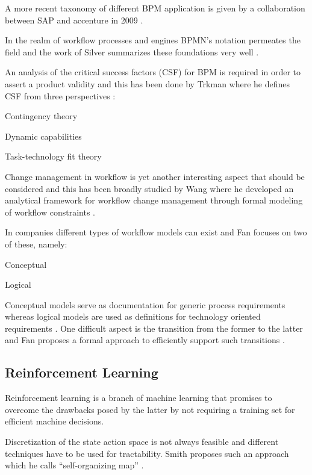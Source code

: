 \documentclass{seal_thesis}
\begin{document}
A more recent taxonomy of different BPM application is given by a collaboration between SAP and accenture in 2009 \cite{EvolvedTechnologist2009}.

In the realm of workflow processes and engines BPMN's notation permeates the field and the work of Silver summarizes these foundations very well \cite{Silver2009}.

An analysis of the critical success factors (CSF) for BPM is required in order to assert a product validity and this has been done by Trkman where he defines CSF from three perspectives \cite{Trkman2010}:
\begin{enumerate*}
	\item Contingency theory
	\item Dynamic capabilities
	\item Task-technology fit theory
\end{enumerate*}


Change management in workflow is yet another interesting aspect that should be considered and this has been broadly studied by Wang where he developed an analytical framework for workflow change management through formal modeling of workflow constraints \cite{Wang2011}.

In companies different types of workflow models can exist and Fan focuses on two of these, namely:
\begin{enumerate*}
	\item Conceptual
	\item Logical
\end{enumerate*}

Conceptual models serve as documentation for generic process requirements whereas logical models are used as definitions for technology oriented requirements \cite{Fan2012}. One difficult aspect is the transition from the former to the latter and Fan proposes a formal approach to efficiently support such transitions \cite{Fan2012}.

\subsection{Reinforcement Learning}

Reinforcement learning is a branch of machine learning that promises to overcome the drawbacks posed by the latter by not requiring a training set for efficient machine decisions.

Discretization of the state action space is not always feasible and different techniques have to be used for tractability. Smith proposes such an approach which he calls ``self-organizing map'' \cite{Smith2002}.
\end{document}
